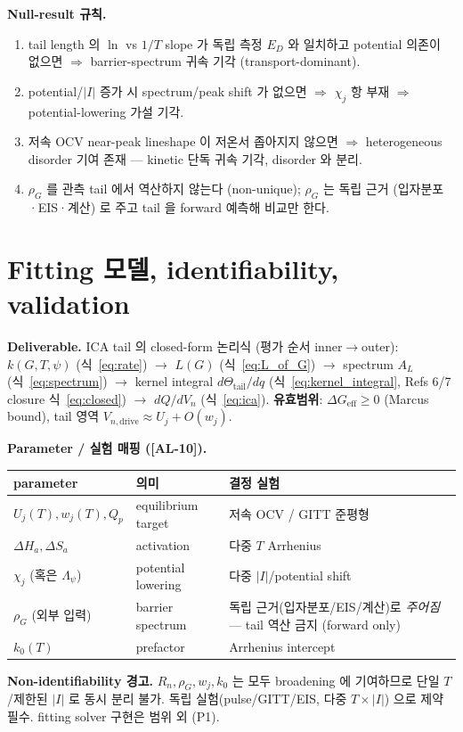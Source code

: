 \documentclass[11pt,a4paper]{article}
\newcommand{\eff}{\mathrm{eff}}
\newcommand{\dimedrive}{\mathrm{drive}}
\newcommand{\AL}[1]{\textsf{[AL-#1]}}
\begin{document}
\textbf{Null-result 규칙.}
\begin{enumerate}[label=(N\arabic*)]
\item tail length 의 $\ln$ vs $1/T$ slope 가 독립 측정 $E_D$ 와 일치하고 potential 의존이
  없으면 $\Rightarrow$ barrier-spectrum 귀속 기각 (transport-dominant).
\item potential/$|I|$ 증가 시 spectrum/peak shift 가 없으면 $\Rightarrow$ $\chi_j$ 항 부재
  $\Rightarrow$ potential-lowering 가설 기각.
\item 저속 OCV near-peak lineshape 이 저온서 좁아지지 않으면 $\Rightarrow$ heterogeneous
  disorder 기여 존재 — kinetic 단독 귀속 기각, disorder 와 분리.
\item $\rho_G$ 를 관측 tail 에서 역산하지 않는다 (non-unique); $\rho_G$ 는 독립 근거
  (입자분포·EIS·계산) 로 주고 tail 을 forward 예측해 비교만 한다.
\end{enumerate}

\section{Fitting 모델, identifiability, validation}\label{sec:fitting}
\textbf{Deliverable.} ICA tail 의 closed-form 논리식 (평가 순서 inner$\to$outer):
$k(G,T,\psi)$ (식~\eqref{eq:rate}) $\to$ $L(G)$ (식~\eqref{eq:L_of_G}) $\to$ spectrum
$A_L$ (식~\eqref{eq:spectrum}) $\to$ kernel integral $d\Theta_\mathrm{tail}/dq$
(식~\eqref{eq:kernel_integral}, Refs 6/7 closure 식~\eqref{eq:closed}) $\to$ $dQ/dV_n$
(식~\eqref{eq:ica}). \textbf{유효범위}: $\Delta G_\eff\ge0$ (Marcus bound), tail 영역
$V_{n,\dimedrive}\approx U_j+O(w_j)$.

\textbf{Parameter / 실험 매핑 (\AL{10}).}
\begin{longtable}{p{} p{} p{}}
\toprule parameter & 의미 & 결정 실험 \\ \midrule \endhead
$U_j(T),w_j(T),Q_p$ & equilibrium target & 저속 OCV / GITT 준평형 \\
$\Delta H_a,\Delta S_a$ & activation & 다중 $T$ Arrhenius \\
$\chi_j$ (혹은 $\Lambda_\psi$) & potential lowering & 다중 $|I|$/potential shift \\
$\rho_G$ (외부 입력) & barrier spectrum & 독립 근거(입자분포/EIS/계산)로 \emph{주어짐} — tail 역산 금지 (forward only) \\
$k_0(T)$ & prefactor & Arrhenius intercept \\
\bottomrule
\end{longtable}
\textbf{Non-identifiability 경고.} $R_n,\rho_G,w_j,k_0$ 는 모두 broadening 에 기여하므로
단일 $T$/제한된 $|I|$ 로 동시 분리 불가. 독립 실험(pulse/GITT/EIS, 다중 $T\times|I|$) 으로
제약 필수. fitting solver 구현은 범위 외 (P1).
\end{document}
